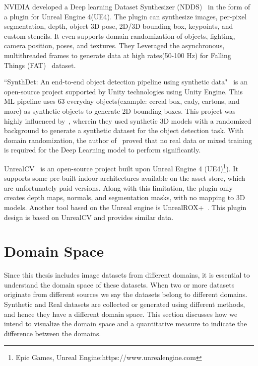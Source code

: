 NVIDIA developed a Deep learning Dataset Synthesizer (NDDS)~\cite{to2018ndds} in the form of a plugin for Unreal Engine 4(UE4).
The plugin can synthesize images, per-pixel segmentation, depth, object 3D pose, 2D/3D bounding box, keypoints, and custom stencils.
It even supports domain randomization of objects, lighting, camera position, poses, and textures.
They Leveraged the asynchronous, multithreaded frames to generate data at high rates(50-100 Hz) for Falling Things (FAT)~\cite{Tremblay2018} dataset.

``SynthDet: An end-to-end object detection pipeline using synthetic data"~\cite{synthdet2020} is an open-source project supported by Unity technologies using Unity Engine.
This ML pipeline uses 63 everyday objects(example: cereal box, cady, cartons, and more) as synthetic objects to generate 2D bounding boxes.
This project was highly influenced by~\cite{hinterstoisser2019annotation}, wherein they used synthetic 3D models with a randomized background to generate a synthetic dataset for the object detection task.
With domain randomization, the author of~\cite{hinterstoisser2019annotation} proved that no real data or mixed training is required for the Deep Learning model to perform significantly.

UnrealCV~\cite{Qiu2017} is an open-source project built upon Unreal Engine 4 (UE4)\footnote{Epic Games, Unreal Engine:https://www.unrealengine.com}).
It supports some pre-built indoor architectures available on the asset store, which are unfortunately paid versions.
Along with this limitation, the plugin only creates depth maps, normals, and segmentation masks, with no mapping to 3D models.
Another tool based on the Unreal engine is UnrealROX+~\cite{martinezgonzalez2021unrealrox}.
This plugin design is based on UnrealCV and provides similar data.

\section{Domain Space}\label{sec:domain-space}

Since this thesis includes image datasets from different domains, it is essential to understand the domain space of these datasets.
When two or more datasets originate from different sources we say the datasets belong to different domains.
Synthetic and Real datasets are collected or generated using different methods, and hence they have a different domain space.
This section discusses how we intend to visualize the domain space and a quantitative measure to indicate the difference between the domains.


